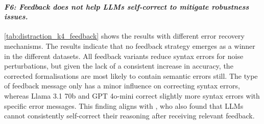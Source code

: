 \paragraph{\textbf{\emph{F6: Feedback does not help \acp{LLM} self-correct to mitigate robustness issues.}}}
\autoref{tab:distraction_k4_feedback} shows the results with different error recovery mechanisms. The results indicate that no feedback strategy emerges as a winner in the different datasets. 
All feedback variants reduce syntax errors for noise perturbations, but given the lack of a consistent increase in accuracy, the corrected formalisations are most likely to contain semantic errors still. 
The type of feedback message only has a minor influence on correcting syntax errors, whereas Llama 3.1 70b and GPT 4o-mini correct slightly more syntax errors with specific error messages. This finding aligns with \cite{huang2023large}, who also found that \acp{LLM} cannot consistently self-correct their reasoning after receiving relevant feedback.


